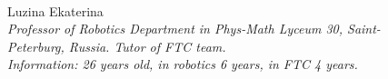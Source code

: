 \begin{figure}[H]
\begin{minipage}[h]{0.47\linewidth}
		\\
	\end{minipage}
	\hfill
	\begin{minipage}{0.47\linewidth}
		Luzina Ekaterina \\
		\emph{Professor of Robotics Department in Phys-Math Lyceum 30, Saint-Peterburg, Russia. Tutor of FTC team. \\}
		\emph{Information: 26 years old, in robotics 6 years, in FTC 4 years.}
	\end{minipage}
\end{figure}

